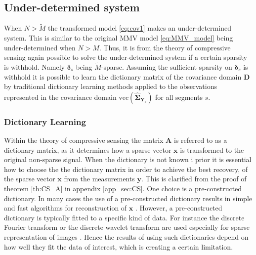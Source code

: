 \subsection{Under-determined system}\label{sec:cov1}
When $N > \widetilde{M}$ the transformed model \eqref{eq:cov1} makes an under-determined system.   
This is similar to the original MMV model \eqref{eq:MMV_model} being under-determined  when $N > M$. 
Thus, it is from the theory of compressive sensing again possible to solve the under-determined system if a certain sparsity is withhold. 
Namely $\boldsymbol{\delta}_s$ being $\widetilde{M}$-sparse.
Assuming the sufficient sparsity on $\boldsymbol{\delta}_s$ is withhold it is possible to learn the dictionary matrix of the covariance domain $\mathbf{D}$ by traditional dictionary learning methods applied to the observations represented in the covariance domain $\text{vec}(\widehat{\boldsymbol{\Sigma}}_{\mathbf{Y}_s})$ for all segments $s$.

\subsubsection{Dictionary Learning}\label{sec:dictionarylearning}
Within the theory of compressive sensing the matrix $\textbf{A}$ is referred to as a dictionary matrix, as it determines how a sparse vector $\textbf{x}$ is transformed to the original non-sparse signal. 
When the dictionary is not known i prior it is essential how to choose the the dictionary matrix in order to achieve the best recovery, of the sparse vector $\mathbf{x}$ from the measurements $\mathbf{y}$. 
This is clarified from the proof of theorem \ref{th:CS_A} in appendix \ref{app_sec:CS}. 
One choice is a pre-constructed dictionary. 
In many cases the use of a pre-constructed dictionary results in simple and fast algorithms for reconstruction of $\mathbf{x}$ \cite{Elad_book}. 
However, a pre-constructed dictionary is typically fitted to a specific kind of data. 
For instance the discrete Fourier transform or the discrete wavelet transform are used especially for sparse representation of images \cite{Elad_book}. 
Hence the results of using such dictionaries depend on how well they fit the data of interest, which is creating a certain limitation. 

